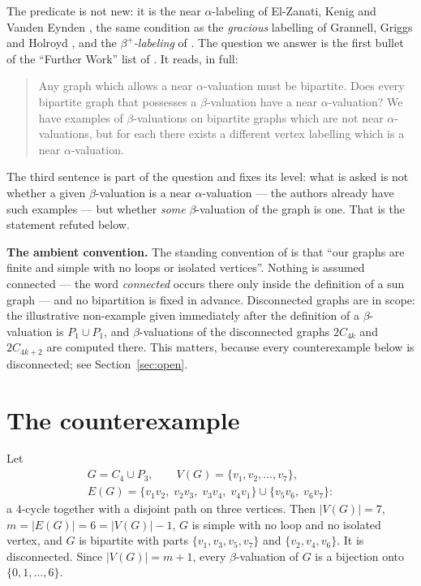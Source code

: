 \documentclass[11pt]{amsart}
\theoremstyle{remark}
\begin{document}
The predicate is not new: it is the near $\alpha$-labeling of El-Zanati, Kenig
and Vanden Eynden \cite{EKV}, the same condition as the \emph{gracious}
labelling of Grannell, Griggs and Holroyd \cite{GGH}, and the
\emph{$\beta^{+}$-labeling} of \cite[A342225]{OEIS}. The question we answer is
the first bullet of the ``Further Work'' list of \cite{AHM}. It reads, in full:

\begin{quote}
Any graph which allows a near $\alpha$-valuation must be bipartite. Does every
bipartite graph that possesses a $\beta$-valuation have a near
$\alpha$-valuation? We have examples of $\beta$-valuations on bipartite graphs
which are not near $\alpha$-valuations, but for each there exists a different
vertex labelling which is a near $\alpha$-valuation.
\end{quote}

The third sentence is part of the question and fixes its level: what is asked is
not whether a given $\beta$-valuation is a near $\alpha$-valuation --- the
authors already have such examples --- but whether \emph{some} $\beta$-valuation
of the graph is one. That is the statement refuted below.

\medskip\noindent\textbf{The ambient convention.}
The standing convention of \cite{AHM} is that ``our graphs are finite and simple
with no loops or isolated vertices''. Nothing is assumed connected --- the word
\emph{connected} occurs there only inside the definition of a sun graph --- and
no bipartition is fixed in advance. Disconnected graphs are in scope: the
illustrative non-example given immediately after the definition of a
$\beta$-valuation is $P_1\cup P_1$, and $\beta$-valuations of the disconnected
graphs $2C_{4k}$ and $2C_{4k+2}$ are computed there. This matters, because every
counterexample below is disconnected; see Section~\ref{sec:open}.

\section{The counterexample}\label{sec:main}

Let
\begin{gather*}
 G=C_4\cup P_3,
 \qquad
 V(G)=\{v_1,v_2,\ldots,v_7\},\\
 E(G)=\{v_1v_2,\;v_2v_3,\;v_3v_4,\;v_4v_1\}
      \cup\{v_5v_6,\;v_6v_7\}:
\end{gather*}
a $4$-cycle together with a disjoint path on three vertices. Then
$|V(G)|=7$, $m=|E(G)|=6=|V(G)|-1$, $G$ is simple with no loop and no isolated
vertex, and $G$ is bipartite with parts $\{v_1,v_3,v_5,v_7\}$ and
$\{v_2,v_4,v_6\}$. It is disconnected. Since $|V(G)|=m+1$, every
$\beta$-valuation of $G$ is a bijection onto $\{0,1,\ldots,6\}$.
\end{document}
